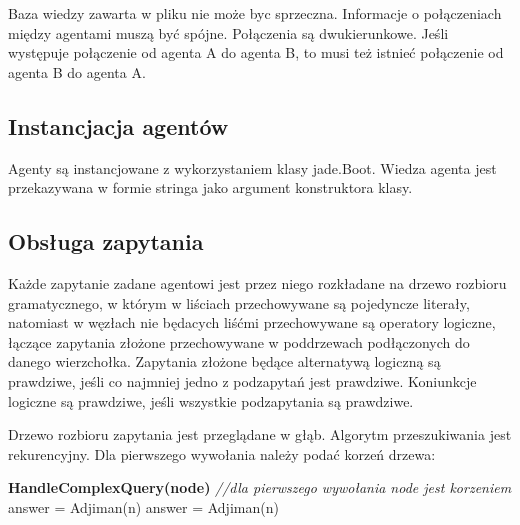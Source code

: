 \documentclass[a4paper,12pt]{mwart}
\begin{document}
Baza wiedzy zawarta w pliku nie może byc sprzeczna. Informacje o połączeniach między agentami muszą być spójne. Połączenia są dwukierunkowe. Jeśli występuje połączenie od agenta A do agenta B, to musi też istnieć połączenie od agenta B do agenta A. 

\subsection{Instancjacja agentów}
Agenty są instancjowane z wykorzystaniem klasy jade.Boot. Wiedza agenta jest przekazywana w formie stringa jako argument konstruktora klasy.

\subsection{Obsługa zapytania}
Każde zapytanie zadane agentowi jest przez niego rozkładane na drzewo rozbioru gramatycznego, w którym w liściach przechowywane są pojedyncze literały, natomiast w węzłach nie będacych liśćmi przechowywane są operatory logiczne, łączące zapytania złożone przechowywane w poddrzewach podłączonych do danego wierzchołka.
Zapytania złożone będące alternatywą logiczną są prawdziwe, jeśli co najmniej jedno z podzapytań jest prawdziwe. Koniunkcje logiczne są prawdziwe, jeśli wszystkie podzapytania są prawdziwe.

Drzewo rozbioru zapytania jest przeglądane w głąb. Algorytm przeszukiwania jest rekurencyjny. Dla pierwszego wywołania należy podać korzeń drzewa:
\begin{algorithm}
\begin{algorithmic}
\STATE \textbf{HandleComplexQuery(node)}
\textit{//dla pierwszego wywołania node jest korzeniem}
\ENDIF    
{}
             	\STATE answer = Adjiman(n)
                \RETURN{\TRUE}
		\ENDIF
	    \ENDFOR
            \RETURN{\FALSE}
\ENDIF
{}
\STATE answer = Adjiman(n)
                    \RETURN{\FALSE}
\ENDIF
\ENDFOR
\RETURN{\TRUE}
\ENDIF
\ENDIF
\end{algorithmic}
\end{algorithm}
\end{document}

